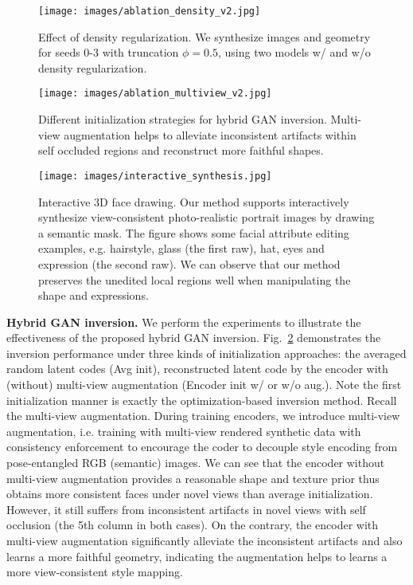 \documentclass[acmtog]{acmart}
\begin{document}
\begin{figure}[t]
  \centering
  \texttt{[image: images/ablation\_density\_v2.jpg]}
  \caption{Effect of density regularization. We synthesize images and geometry for seeds 0-3 with truncation $\phi=0.5$, using two models w/ and w/o density regularization.}
  \Description{}
  \label{fig:density}
\end{figure}

\begin{figure}[b]
  \centering
  \texttt{[image: images/ablation\_multiview\_v2.jpg]}
  \caption{Different initialization strategies for hybrid GAN inversion. Multi-view augmentation helps to alleviate inconsistent artifacts within self occluded regions and reconstruct more faithful shapes. }
  \Description{}
  \label{fig:multiview}
\end{figure}


\begin{figure*}[t]
  \centering
  \texttt{[image: images/interactive\_synthesis.jpg]}
  \caption{Interactive 3D face drawing. Our method supports interactively synthesize view-consistent photo-realistic portrait images by drawing a semantic mask. The figure shows some facial attribute editing examples, e.g. hairstyle, glass (the first raw), hat, eyes and expression (the second raw). We can observe that our method preserves the unedited local regions well when manipulating the shape and expressions.}
  \Description{}
  \label{fig:interactive}
\end{figure*}

\noindent \textbf{Hybrid GAN inversion.} We perform the experiments to illustrate the effectiveness of the proposed hybrid GAN inversion. Fig.~\ref{fig:multiview} demonstrates the inversion performance under three kinds of initialization approaches: the averaged random latent codes (Avg init), reconstructed latent code by the encoder with (without) multi-view augmentation (Encoder init w/ or w/o aug.). Note the first initialization manner is exactly the optimization-based inversion method. Recall the multi-view augmentation. During training encoders, we introduce multi-view augmentation, i.e. training with multi-view rendered synthetic data with consistency enforcement to encourage the coder to decouple style encoding from pose-entangled RGB (semantic) images.
We can see that the encoder without multi-view augmentation provides a reasonable shape and texture prior thus obtains more consistent faces under novel views than average initialization. However, it still suffers from inconsistent artifacts in novel views with self occlusion (the 5th column in both cases). On the contrary, the encoder with multi-view augmentation significantly alleviate the inconsistent artifacts and also learns a more faithful geometry,  indicating the augmentation helps to learns a more view-consistent style mapping. 
\end{document}
